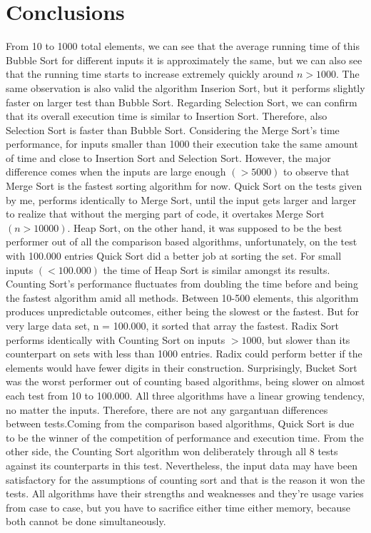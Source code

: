 \documentclass[11pt, letter paper]{article}
\begin{document}
        \section{Conclusions}
        From 10 to 1000 total elements, we can see that the average running time of this Bubble Sort for different inputs it is approximately the same, but we can also see that the running time starts to increase extremely quickly around $n > 1000$.
    	The same observation is also valid the algorithm Inserion Sort, but it performs slightly faster on larger test than     Bubble Sort. Regarding Selection Sort, we can confirm that its overall execution time is similar to Insertion Sort. Therefore, also        Selection Sort is faster than Bubble Sort.
	  Considering the Merge Sort’s time performance, for inputs smaller than 1000 their execution take the same amount of time and   
        close to Insertion Sort and Selection Sort. However, the major difference comes when the inputs are large enough $(>5000)$ to observe that Merge Sort is the fastest sorting algorithm for now.
    	Quick Sort on the tests given by me, performs identically to Merge Sort, until the input gets larger and larger to realize that      without the merging part of code, it overtakes Merge Sort $(n>10000)$.
    	Heap Sort, on the other hand, it was supposed to be the best performer out of all the comparison based algorithms,             
        unfortunately, on the test with 100.000 entries Quick Sort did a better job at sorting the set. For small inputs $(<100.000)$ the time of Heap Sort is similar amongst its results.
        Counting Sort’s performance fluctuates from doubling the time before and being the fastest algorithm amid all methods. Between 10-500 elements, this algorithm produces unpredictable outcomes, either being the slowest or the fastest. But for very large data set, n = 100.000, it sorted that array the fastest. Radix Sort performs identically with Counting Sort on inputs $> 1000$, but slower than its counterpart on sets with less than 1000 entries. Radix could perform better if the elements would have fewer digits in their construction. Surprisingly, Bucket Sort was the worst performer out of counting based algorithms, being slower on almost each test from 10 to 100.000. All three algorithms have a linear growing tendency, no matter the inputs. Therefore, there are not any gargantuan differences between tests.Coming from the comparison based algorithms, Quick Sort is due to be the winner of the competition of performance and execution time. From the other side, the Counting Sort algorithm won deliberately  through all 8 tests against its counterparts in this test. Nevertheless, the input data may have been satisfactory for the assumptions of counting sort and that is the reason it won the tests. All algorithms have their strengths and weaknesses and they’re usage varies from case to case, but you have to sacrifice either time either memory, because both cannot be done simultaneously.

        \printbibliography
\end{document}
